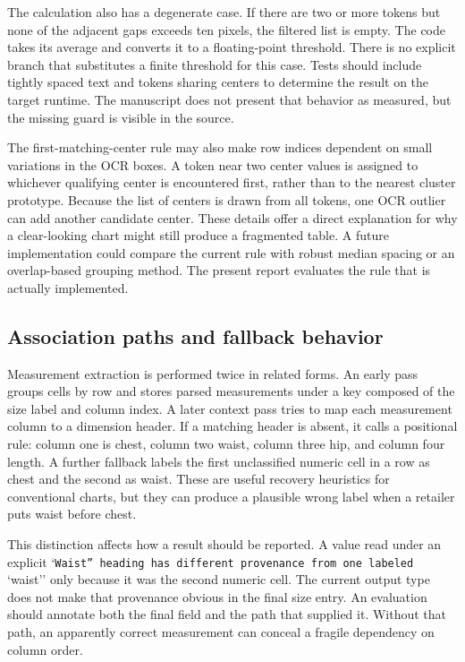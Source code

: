 \documentclass[10pt,letterpaper]{article}
\begin{document}
The calculation also has a degenerate case. If there are two or more tokens but none of the adjacent gaps exceeds ten pixels, the filtered list is empty. The code takes its average and converts it to a floating-point threshold. There is no explicit branch that substitutes a finite threshold for this case. Tests should include tightly spaced text and tokens sharing centers to determine the result on the target runtime. The manuscript does not present that behavior as measured, but the missing guard is visible in the source.

The first-matching-center rule may also make row indices dependent on small variations in the OCR boxes. A token near two center values is assigned to whichever qualifying center is encountered first, rather than to the nearest cluster prototype. Because the list of centers is drawn from all tokens, one OCR outlier can add another candidate center. These details offer a direct explanation for why a clear-looking chart might still produce a fragmented table. A future implementation could compare the current rule with robust median spacing or an overlap-based grouping method. The present report evaluates the rule that is actually implemented.

\subsection{Association paths and fallback behavior}

Measurement extraction is performed twice in related forms. An early pass groups cells by row and stores parsed measurements under a key composed of the size label and column index. A later context pass tries to map each measurement column to a dimension header. If a matching header is absent, it calls a positional rule: column one is chest, column two waist, column three hip, and column four length. A further fallback labels the first unclassified numeric cell in a row as chest and the second as waist. These are useful recovery heuristics for conventional charts, but they can produce a plausible wrong label when a retailer puts waist before chest.

This distinction affects how a result should be reported. A value read under an explicit `\texttt{Waist'' heading has different provenance from one labeled }`waist'' only because it was the second numeric cell. The current output type does not make that provenance obvious in the final size entry. An evaluation should annotate both the final field and the path that supplied it. Without that path, an apparently correct measurement can conceal a fragile dependency on column order.
\end{document}
